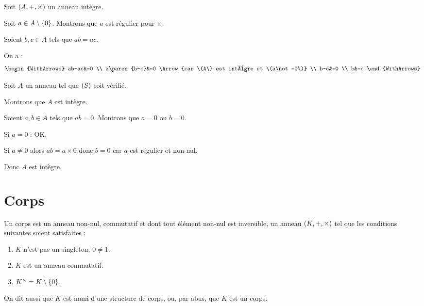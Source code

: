 \begin{dem}
\impdir

Soit \(\anneau{A}\) un anneau intègre.

Soit \(a\in A\setminus\left\lbrace0\right\rbrace\). Montrons que \(a\) est régulier pour \(\times\).

Soient \(b,c\in A\) tels que \(ab=ac\).

On a : \[\begin{WithArrows}
ab-ac&=0 \\
a\paren{b-c}&=0 \Arrow{car \(A\) est intègre et \(a\not=0\)} \\
b-c&=0 \\
b&=c
\end{WithArrows}\]

\imprec

Soit \(A\) un anneau tel que \(\left(S\right)\) soit vérifié.

Montrons que \(A\) est intègre.

Soient \(a,b\in A\) tels que \(ab=0\). Montrons que \(a=0\) ou \(b=0\).

Si \(a=0\) : OK.

Si \(a\not=0\) alors \(ab=a\times0\) donc \(b=0\) car \(a\) est régulier et non-nul.

Donc \(A\) est intègre.
\end{dem}

\section{Corps}

\begin{defi}[Corps]
Un corps est un anneau non-nul, commutatif et dont tout élément non-nul est inversible, \cad un anneau \(\anneau{K}\) tel que les conditions suivantes soient satisfaites :

\begin{enumerate}
\item \(K\) n'est pas un singleton, \cad \(0\not=1\). \\

\item \(K\) est un anneau commutatif. \\

\item \(K^{\times}=K\setminus\left\lbrace0\right\rbrace\).
\end{enumerate}

On dit aussi que \(K\) est muni d'une structure de corps, ou, par abus, que \(K\) est un corps.
\end{defi}


